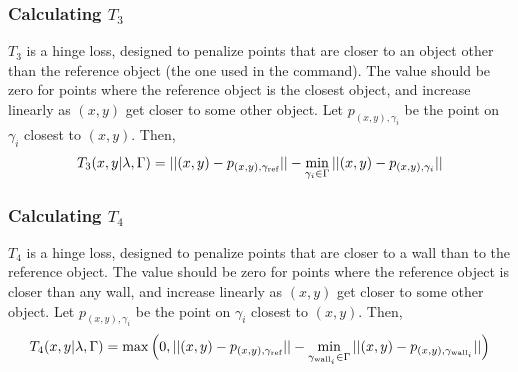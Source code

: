 \documentclass[12pt,letterpaper]{article}
\newcommand\refobj{\textmd{ref}}
\begin{document}
\subsubsection*{Calculating $T_3$}
$T_3$ is a hinge loss, designed to penalize points that are closer to an object other than the reference object (the one used in the command). The value should be zero for points where the reference object is the closest object, and increase linearly as $(x, y)$ get closer to some other object. Let $p_{(x, y), \gamma_i}$ be the point on $\gamma_i$ closest to $(x, y)$. Then,
\[
T_3(x, y|\lambda, \Gamma) = ||(x, y) - p_{(x, y), \gamma_{\refobj}}|| - \min_{\gamma_i \in \Gamma} ||(x, y) - p_{(x, y), \gamma_i}||
\]

\subsubsection*{Calculating $T_4$}
$T_4$ is a hinge loss, designed to penalize points that are closer to a wall than to the reference object. The value should be zero for points where the reference object is closer than any wall, and increase linearly as $(x, y)$ get closer to some other object. Let $p_{(x, y), \gamma_i}$ be the point on $\gamma_i$ closest to $(x, y)$. Then,
\[
T_4(x, y|\lambda, \Gamma) = \max\Big(0, ||(x, y) - p_{(x, y), \gamma_{\refobj}}|| - \min_{\gamma_{\textmd{wall}_i} \in \Gamma} ||(x, y) - p_{(x, y), \gamma_{\textmd{wall}_i}}||\Big)
\]
\end{document}

